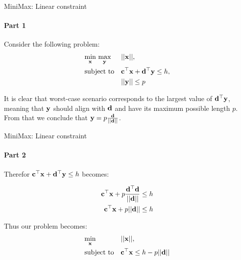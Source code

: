 \documentclass{beamer}
\begin{document}
\begin{frame}{MiniMax: Linear constraint}
\framesubtitle{Part 1}
\begin{flushleft}

Consider the following problem:
%
\begin{equation}
\begin{aligned}
& \underset{\mathbf{x}}{\text{min}} \ \underset{\mathbf{y}}{\text{max}}
& & ||\mathbf{x}||, \\
& \text{subject to}
& & \mathbf{c}^\top \mathbf{x} + \mathbf{d}^\top \mathbf{y} \leq h, \\
& & & ||\mathbf{y}|| \leq p
\end{aligned}
\end{equation}

It is clear that worst-case scenario corresponds to the largest value of $\mathbf{d}^\top \mathbf{y}$, meaning that $\mathbf{y}$ should align with $\mathbf{d}$ and have its maximum possible length $p$. From that we conclude that $\mathbf{y} =  p \frac{\mathbf{d}}{|| \mathbf{d} ||} $.
 
\end{flushleft}
\end{frame}



\begin{frame}{MiniMax: Linear constraint}
\framesubtitle{Part 2}
\begin{flushleft}

Therefor $\mathbf{c}^\top \mathbf{x} + \mathbf{d}^\top \mathbf{y} \leq h$ becomes:

\begin{align}
    \mathbf{c}^\top \mathbf{x} + p  \frac{\mathbf{d}^\top\mathbf{d}}{|| \mathbf{d} ||} \leq h \\
    \mathbf{c}^\top \mathbf{x} + p || \mathbf{d} || \leq h 
\end{align}

\bigskip

Thus our problem becomes:
%
\begin{equation}
\begin{aligned}
& \underset{\mathbf{x}}{\text{min}}
& & ||\mathbf{x}||, \\
& \text{subject to}
& & \mathbf{c}^\top \mathbf{x} \leq h - p || \mathbf{d} ||
\end{aligned}
\end{equation}
 
\end{flushleft}
\end{frame}
\end{document}
